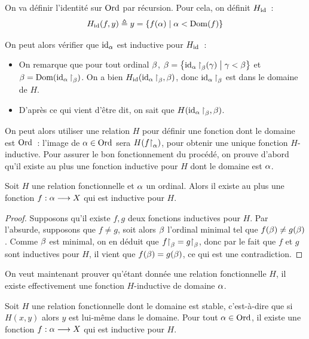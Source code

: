 \begin{example}
  On va définir l'identité sur $\operatorname{Ord}$ par récursion. Pour cela, on définit
  $H_{\operatorname{id}}$~:
  \[H_{\operatorname{id}}(f,y) \triangleq y = \left\{ f(\alpha) \;\middle\vert\; \alpha < \operatorname{Dom}(f) \right\}\]

  On peut alors vérifier que $\operatorname{id}_\alpha$ est inductive pour $H_{\operatorname{id}}$~:
  \begin{itemize}
  \item On remarque que pour tout ordinal $\beta$,
    $\beta = \left\{ \operatorname{id}_{\alpha}\mathbin{\upharpoonright}_{\beta}(\gamma) \;\middle\vert\; \gamma < \beta \right\}$
    et $\beta = \operatorname{Dom}(\operatorname{id}_{\alpha}\mathbin{\upharpoonright}_{\beta})$.
    On a bien $H_{\operatorname{id}}(\operatorname{id}_{\alpha}\mathbin{\upharpoonright}_{\beta},\beta)$, donc
    $\operatorname{id}_{\alpha}\mathbin{\upharpoonright}_{\beta}$ est dans le domaine de $H$.
  \item D'après ce qui vient d'être dit, on sait que
    $H(\operatorname{id}_{\alpha}\mathbin{\upharpoonright}_{\beta},\beta)$.
  \end{itemize}
\end{example}

On peut alors utiliser une relation $H$ pour définir une fonction dont le
domaine est $\operatorname{Ord}$~: l'image de $\alpha\in\operatorname{Ord}$ sera $H(f\mathbin{\upharpoonright}_{\alpha})$, pour
obtenir une unique fonction $H$-inductive. Pour assurer le bon fonctionnement
du procédé, on prouve d'abord qu'il existe au plus une fonction inductive pour
$H$ dont le domaine est $\alpha$.

\begin{lemma}
  Soit $H$ une relation fonctionnelle et $\alpha$ un ordinal. Alors il existe
  au plus une fonction $f : \displaystyle \alpha \longrightarrow X$ qui est inductive pour $H$.
\end{lemma}

\begin{proof}
  Supposons qu'il existe $f,g$ deux fonctions inductives pour $H$. Par
  l'absurde, supposons que $f\neq g$, soit alors $\beta$ l'ordinal minimal tel
  que $f(\beta)\neq g(\beta)$. Comme $\beta$ est minimal, on en déduit que
  $f\mathbin{\upharpoonright}_{\beta}=g\mathbin{\upharpoonright}_{\beta}$, donc par le fait que $f$ et $g$ sont
  inductives pour $H$, il vient que $f(\beta) = g(\beta)$, ce qui est une
  contradiction.
\end{proof}

On veut maintenant prouver qu'étant donnée une relation fonctionnelle $H$,
il existe effectivement une fonction $H$-inductive de domaine $\alpha$.

\begin{lemma}
  Soit $H$ une relation fonctionnelle dont le domaine est stable, c'est-à-dire
  que si $H(x,y)$ alors $y$ est lui-même dans le domaine. Pour tout
  $\alpha \in \operatorname{Ord}$, il existe une fonction $f : \displaystyle \alpha \longrightarrow X$ qui est
  inductive pour $H$.
\end{lemma}

